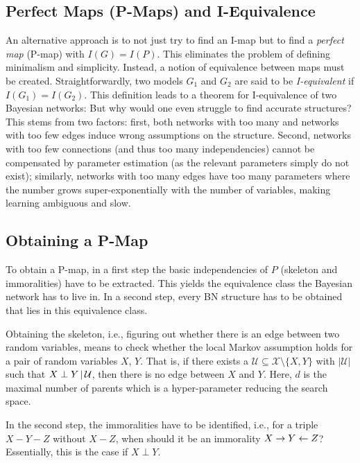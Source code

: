 		\subsection{Perfect Maps (P-Maps) and I-Equivalence}
			An alternative approach is to not just try to find an I-map but to find a \emph{perfect map} (P-map) with \( I(G) = I(P) \). This eliminates the problem of defining minimalism and simplicity. Instead, a notion of equivalence between maps must be created. Straightforwardly, two models \(G_1\) and \(G_2\) are said to be \emph{I-equivalent} if \( I(G_1) = I(G_2) \). This definition leads to a theorem for I-equivalence of two Bayesian networks:
			But why would one even struggle to find accurate structures? This stems from two factors: first, both networks with too many and networks with too few edges induce wrong assumptions on the structure. Second, networks with too few connections (and thus too many independencies) cannot be compensated by parameter estimation (as the relevant parameters simply do not exist); similarly, networks with too many edges have too many parameters where the number grows super-exponentially with the number of variables, making learning ambiguous and slow.

		\subsection{Obtaining a P-Map}
			To obtain a P-map, in a first step the basic independencies of \(P\) (skeleton and immoralities) have to be extracted. This yields the equivalence class the Bayesian network has to live in. In a second step, every BN structure has to be obtained that lies in this equivalence class.

			Obtaining the skeleton, i.e., figuring out whether there is an edge between two random variables, means to check whether the local Markov assumption holds for a pair of random variables \(X\), \(Y\). That is, if there exists a \( \mathcal{U} \subseteq \mathcal{X} \setminus \{ X, Y \} \) with \( \lvert \mathcal{U} \rvert \) such that \( X \perp Y \,\vert\, \mathcal{U} \), then there is no edge between \(X\) and \(Y\). Here, \(d\) is the maximal number of parents which is a hyper-parameter reducing the search space.

			In the second step, the immoralities have to be identified, i.e., for a triple \( X - Y - Z \) without \( X - Z \), when should it be an immorality \( X \to Y \leftarrow Z \)? Essentially, this is the case if \( X \perp Y \).

